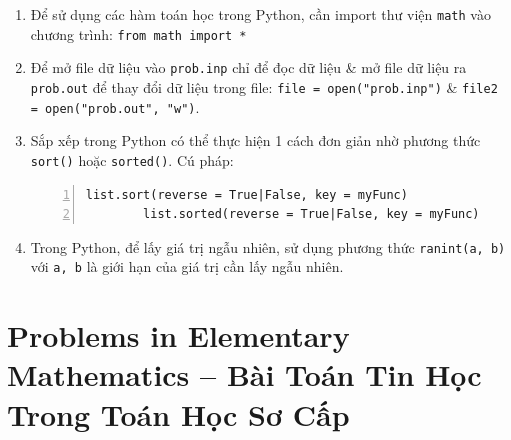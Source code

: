 \documentclass{article}
\begin{document}
\begin{enumerate}
	\item Để sử dụng các hàm toán học trong Python, cần import thư viện \texttt{math} vào chương trình: \texttt{from math import *}
	\item Để mở file dữ liệu vào \texttt{prob.inp} chỉ để đọc dữ liệu \& mở file dữ liệu ra \texttt{prob.out} để thay đổi dữ liệu trong file: \texttt{file = open("prob.inp")} \& \texttt{file2 = open("prob.out", "w")}.
	\item Sắp xếp trong Python có thể thực hiện 1 cách đơn giản nhờ phương thức \texttt{sort()} hoặc \texttt{sorted()}. Cú pháp:
	\begin{Verbatim}[numbers=left,xleftmargin=5mm]
		list.sort(reverse = True|False, key = myFunc)
		list.sorted(reverse = True|False, key = myFunc)
	\end{Verbatim}
	\item Trong Python, để lấy giá trị ngẫu nhiên, sử dụng phương thức \texttt{ranint(a, b)} với \texttt{a, b} là giới hạn của giá trị cần lấy ngẫu nhiên.
\end{enumerate}


\section{Problems in Elementary Mathematics  -- Bài Toán Tin Học Trong Toán Học Sơ Cấp}
\end{document}
